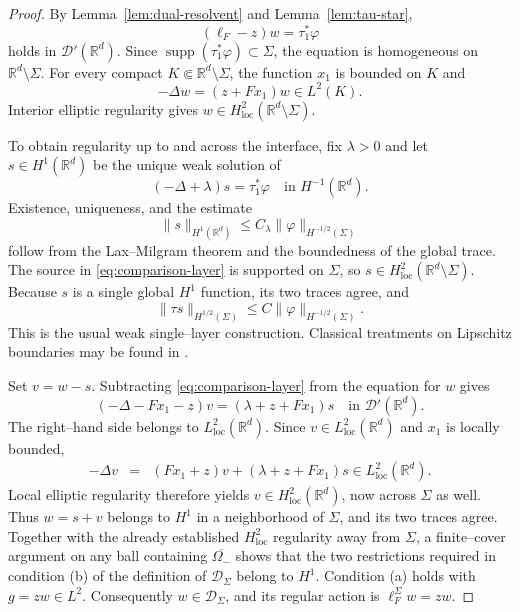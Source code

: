\documentclass[a4paper,11pt]{article}
\numberwithin{equation}{section}
\theoremstyle{remark}
\theoremstyle{definition}
\theoremstyle{remark}
\begin{document}
\begin{proof}
By Lemma~\ref{lem:dual-resolvent} and Lemma~\ref{lem:tau-star},
$$
(\ell_F-z)w=\tau_1^*\varphi
$$
holds in $\mathcal D'(\mathbb R^d)$.
Since $\operatorname{supp}(\tau_1^*\varphi)\subset\Sigma$, the equation is homogeneous on $\mathbb R^d\setminus\Sigma$.
For every compact $K\Subset\mathbb R^d\setminus\Sigma$, the function $x_1$ is bounded on $K$ and
$$
-\Delta w=(z+Fx_1)w\in L^2(K).
$$
Interior elliptic regularity gives $w\in H^2_{\mathrm{loc}}(\mathbb R^d\setminus\Sigma)$.

To obtain regularity up to and across the interface, fix $\lambda>0$ and let $s\in H^1(\mathbb R^d)$ be the unique weak solution of
\begin{equation}\label{eq:comparison-layer}
(-\Delta+\lambda)s=\tau_1^*\varphi
\quad\text{in }H^{-1}(\mathbb R^d).
\end{equation}
Existence, uniqueness, and the estimate
$$
\|s\|_{H^1(\mathbb R^d)}
\le C_\lambda\|\varphi\|_{H^{-1/2}(\Sigma)}
$$
follow from the Lax--Milgram theorem and the boundedness of the global trace.
The source in \eqref{eq:comparison-layer} is supported on $\Sigma$, so $s\in H^2_{\mathrm{loc}}(\mathbb R^d\setminus\Sigma)$.
Because $s$ is a single global $H^1$ function, its two traces agree, and
$$
\|\tau s\|_{H^{1/2}(\Sigma)}
\le C\|\varphi\|_{H^{-1/2}(\Sigma)}.
$$
This is the usual weak single--layer construction.
Classical treatments on Lipschitz boundaries may be found in \cite{Costabel1988,McLean2000,Verchota1984}.

Set $v=w-s$.
Subtracting \eqref{eq:comparison-layer} from the equation for $w$ gives
\begin{equation}\label{eq:v-equation}
(-\Delta-Fx_1-z)v
=(\lambda+z+Fx_1)s
\quad\text{in }\mathcal D'(\mathbb R^d).
\end{equation}
The right--hand side belongs to $L^2_{\mathrm{loc}}(\mathbb R^d)$.
Since $v\in L^2_{\mathrm{loc}}(\mathbb R^d)$ and $x_1$ is locally bounded,
\begin{eqnarray*}
-\Delta v
&=&
(Fx_1+z)v+(\lambda+z+Fx_1)s
\in L^2_{\mathrm{loc}}(\mathbb R^d).
\end{eqnarray*}
Local elliptic regularity therefore yields
$v\in H^2_{\mathrm{loc}}(\mathbb R^d)$, now across $\Sigma$ as well.
Thus $w=s+v$ belongs to $H^1$ in a neighborhood of $\Sigma$, and its two traces agree.
Together with the already established $H^2_{\mathrm{loc}}$ regularity away from $\Sigma$, a finite--cover argument on any ball containing $\overline{\Omega_-}$ shows that the two restrictions required in condition (b) of the definition of $\mathcal D_\Sigma$ belong to $H^1$.
Condition (a) holds with $g=zw\in L^2$.
Consequently $w\in\mathcal D_\Sigma$, and its regular action is $\ell_F^\Sigma w=zw$.


\end{proof}
\end{document}
